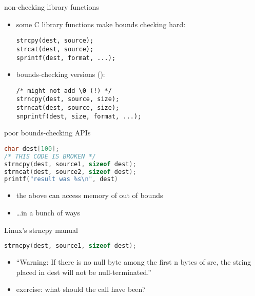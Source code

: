 
\begin{frame}[fragile,label=nonChecking]{non-checking library functions}
\lstset{language=C,style=small}
    \begin{itemize}
    \item some C library functions make bounds checking hard: 
\begin{lstlisting}
strcpy(dest, source);
strcat(dest, source);
sprintf(dest, format, ...);
\end{lstlisting}
    \item bounds-checking versions ():
\begin{lstlisting}
/* might not add \0 (!) */
strncpy(dest, source, size);
strncat(dest, source, size);
snprintf(dest, size, format, ...);
\end{lstlisting}
    \end{itemize}
\end{frame}

\begin{frame}[fragile,label=poorBoundsChecking]{poor bounds-checking APIs}
\begin{lstlisting}[language=C,style=smaller]
char dest[100];
/* THIS CODE IS BROKEN */
strncpy(dest, source1, sizeof dest);
strncat(dest, source2, sizeof dest);
printf("result was %s\n", dest)
\end{lstlisting}
\begin{itemize}
\item the above can access memory of out of bounds
\item \ldots in a bunch of ways
\end{itemize}
\end{frame}

\begin{frame}[fragile,label=strncpyManual]{Linux's strncpy manual}
\begin{lstlisting}[language=C,style=smaller]
strncpy(dest, source1, sizeof dest);
\end{lstlisting}
\begin{itemize}
\item ``Warning: If there is no
       null byte among the first n bytes of src, the string placed in dest will not be null-terminated.''
\end{itemize}
\begin{itemize}
\item exercise: what should the call have been?
\end{itemize}
\end{frame}


